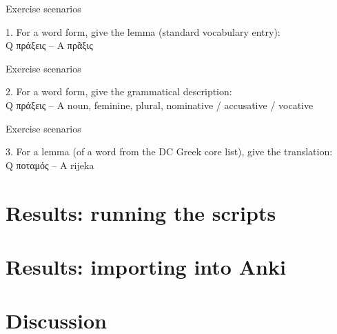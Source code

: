 \documentclass{beamer}
\begin{document}
\begin{frame}{Exercise scenarios}

1. For a word form, give the lemma (standard vocabulary entry):\\
Q πράξεις – A πρᾶξις

\end{frame}

\begin{frame}{Exercise scenarios}


2. For a word form, give the grammatical description:\\
Q πράξεις – A noun, feminine, plural, nominative / accusative / vocative

\end{frame}

\begin{frame}{Exercise scenarios}

3. For a lemma (of a word from the DC Greek core list), give the translation:\\
Q ποταμός – A rijeka

\end{frame}

\section{Results: running the scripts}

\begin{frame}[standout]


\end{frame}

\section{Results: importing into Anki}

\begin{frame}[standout]


\end{frame}


\section{Discussion}

\begin{frame}[standout]


\end{frame}



  \maketitle
\end{document}
